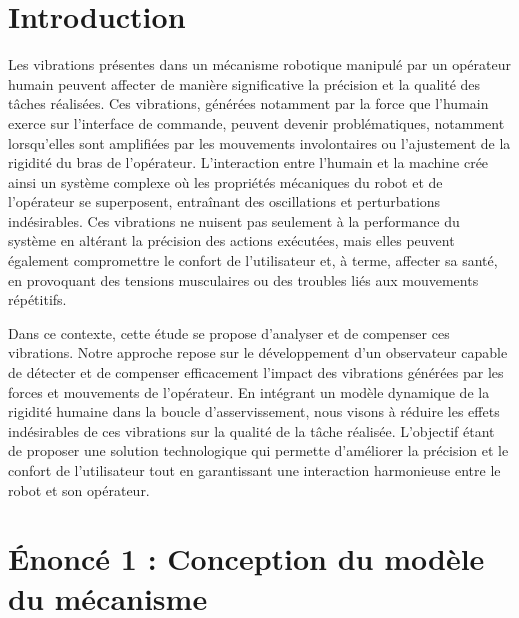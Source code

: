 \documentclass[a4paper,12pt]{article}
\begin{document}
    \tableofcontents
    \newpage
    \listoffigures
    \listoftables
    \newpage
    
    \section{Introduction}
    Les vibrations présentes dans un mécanisme robotique manipulé par un opérateur humain peuvent affecter de manière significative la précision et la qualité des tâches réalisées. Ces vibrations, générées notamment par la force que l'humain exerce sur l'interface de commande, peuvent devenir problématiques, notamment lorsqu’elles sont amplifiées par les mouvements involontaires ou l'ajustement de la rigidité du bras de l'opérateur. L'interaction entre l'humain et la machine crée ainsi un système complexe où les propriétés mécaniques du robot et de l’opérateur se superposent, entraînant des oscillations et perturbations indésirables. Ces vibrations ne nuisent pas seulement à la performance du système en altérant la précision des actions exécutées, mais elles peuvent également compromettre le confort de l'utilisateur et, à terme, affecter sa santé, en provoquant des tensions musculaires ou des troubles liés aux mouvements répétitifs.

    Dans ce contexte, cette étude se propose d'analyser et  de compenser ces vibrations. Notre approche repose sur le développement d’un observateur capable de détecter et de compenser efficacement l'impact des vibrations générées par les forces et mouvements de l’opérateur. En intégrant un modèle dynamique de la rigidité humaine dans la boucle d'asservissement, nous visons à réduire les effets indésirables de ces vibrations sur la qualité de la tâche réalisée. L’objectif étant de proposer une solution technologique qui permette d’améliorer la précision et le confort de l’utilisateur tout en garantissant une interaction harmonieuse entre le robot et son opérateur.

    
    \newpage
    \section{Énoncé 1 : Conception du modèle du mécanisme}
\end{document}

